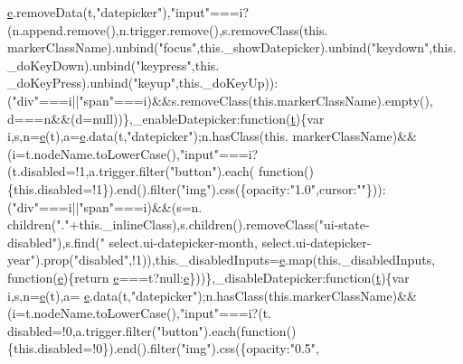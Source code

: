 \begin{DoxyCode}
      \hyperlink{jquery-ui_8min_8js_a2c038346d47955cbe2cb91e338edd7e1}{e}.removeData(t,\textcolor{stringliteral}{"datepicker"}),\textcolor{stringliteral}{"input"}===i?(n.append.remove(),n.trigger.remove(),s.removeClass(this.
      markerClassName).unbind(\textcolor{stringliteral}{"focus"},this.\_showDatepicker).unbind(\textcolor{stringliteral}{"keydown"},this.\_doKeyDown).unbind(\textcolor{stringliteral}{"keypress"},this.
      \_doKeyPress).unbind(\textcolor{stringliteral}{"keyup"},this.\_doKeyUp)):(\textcolor{stringliteral}{"div"}===i||\textcolor{stringliteral}{"span"}===i)&&s.removeClass(this.markerClassName).empty(),
      d===n&&(d=null))\},\_enableDatepicker:\textcolor{keyword}{function}(\hyperlink{jquery-2_80_83_8min_8js_aaccc9105df5383111407fd5b41255e23}{t})\{var i,s,n=\hyperlink{jquery-ui_8min_8js_a2c038346d47955cbe2cb91e338edd7e1}{e}(t),a=\hyperlink{jquery-ui_8min_8js_a2c038346d47955cbe2cb91e338edd7e1}{e}.data(t,\textcolor{stringliteral}{"datepicker"});n.hasClass(this.
      markerClassName)&&(i=t.nodeName.toLowerCase(),\textcolor{stringliteral}{"input"}===i?(t.disabled=!1,a.trigger.filter(\textcolor{stringliteral}{"button"}).each(\textcolor{keyword}{
      function}()\{this.disabled=!1\}).end().filter(\textcolor{stringliteral}{"img"}).css(\{opacity:\textcolor{stringliteral}{"1.0"},cursor:\textcolor{stringliteral}{""}\})):(\textcolor{stringliteral}{"div"}===i||\textcolor{stringliteral}{"span"}===i)&&(s=n.
      children(\textcolor{stringliteral}{"."}+this.\_inlineClass),s.children().removeClass(\textcolor{stringliteral}{"ui-state-disabled"}),s.find(\textcolor{stringliteral}{"
      select.ui-datepicker-month, select.ui-datepicker-year"}).prop(\textcolor{stringliteral}{"disabled"},!1)),this.\_disabledInputs=\hyperlink{jquery-ui_8min_8js_a2c038346d47955cbe2cb91e338edd7e1}{e}.map(this.\_disabledInputs,
      function(\hyperlink{jquery-ui_8min_8js_a2c038346d47955cbe2cb91e338edd7e1}{e})\{\textcolor{keywordflow}{return} \hyperlink{jquery-ui_8min_8js_a2c038346d47955cbe2cb91e338edd7e1}{e}===t?null:\hyperlink{jquery-ui_8min_8js_a2c038346d47955cbe2cb91e338edd7e1}{e}\}))\},\_disableDatepicker:\textcolor{keyword}{function}(\hyperlink{jquery-2_80_83_8min_8js_aaccc9105df5383111407fd5b41255e23}{t})\{var i,s,n=\hyperlink{jquery-ui_8min_8js_a2c038346d47955cbe2cb91e338edd7e1}{e}(t),a=
      \hyperlink{jquery-ui_8min_8js_a2c038346d47955cbe2cb91e338edd7e1}{e}.data(t,\textcolor{stringliteral}{"datepicker"});n.hasClass(this.markerClassName)&&(i=t.nodeName.toLowerCase(),\textcolor{stringliteral}{"input"}===i?(t.
      disabled=!0,a.trigger.filter(\textcolor{stringliteral}{"button"}).each(\textcolor{keyword}{function}()\{this.disabled=!0\}).end().filter(\textcolor{stringliteral}{"img"}).css(\{opacity:\textcolor{stringliteral}{"0.5"},

\end{DoxyCode}
